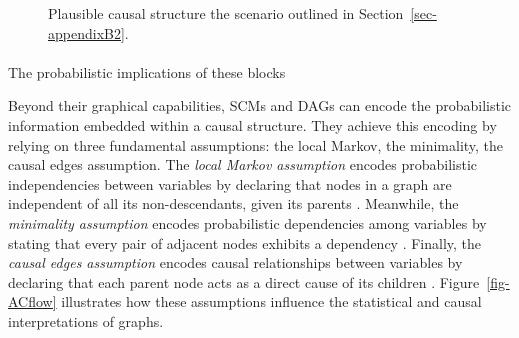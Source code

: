 \documentclass[
  authoryear,
  review,
  1p]{elsarticle}
\makeatletter
\let\oldparagraph\paragraph
\renewcommand{\paragraph}{
    \@ifstar
      \xxxParagraphStar
      \xxxParagraphNoStar
  }
\newcommand{\xxxParagraphStar}[1]{\oldparagraph*{#1}\mbox{}}
\newcommand{\xxxParagraphNoStar}[1]{\oldparagraph{#1}\mbox{}}
\makeatother
\begin{document}
\begin{figure}

\begin{minipage}{0.50\linewidth}

\centering{

\[
\begin{aligned}
  X & := f_{X}(e_{X}) \\
  T & := f_{T}(X,e_{T}) \\
  Y & := f_{Y}(T,X,e_{Y}) \\
  e_{T} & \:\bot\:e_{X} \\
  e_{T} & \:\bot\:e_{Y} \\
  e_{X} & \:\bot\:e_{Y}
\end{aligned}
\]

}


\end{minipage}%
%
\begin{minipage}{0.50\linewidth}



\end{minipage}%

\caption{\label{fig-example1}Plausible causal structure the scenario
outlined in Section~\ref{sec-appendixB2}.}

\end{figure}%

\paragraph{The probabilistic implications of these
blocks}\label{sec-appendixB32}

Beyond their graphical capabilities, SCMs and DAGs can encode the
probabilistic information embedded within a causal structure. They
achieve this encoding by relying on three fundamental assumptions: the
local Markov, the minimality, the causal edges assumption. The
\emph{local Markov assumption} encodes probabilistic independencies
between variables by declaring that nodes in a graph are independent of
all its non-descendants, given its parents \citep[pp.~20]{Neal_2020}.
Meanwhile, the \emph{minimality assumption} encodes probabilistic
dependencies among variables by stating that every pair of adjacent
nodes exhibits a dependency \citep[pp.~21]{Neal_2020}. Finally, the
\emph{causal edges assumption} encodes causal relationships between
variables by declaring that each parent node acts as a direct cause of
its children \citep[pp.~22]{Neal_2020}. Figure~\ref{fig-ACflow}
illustrates how these assumptions influence the statistical and causal
interpretations of graphs.
\end{document}
